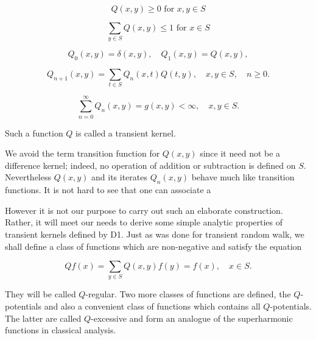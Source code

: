 $$Q(x,y) \geq 0 \text{ for } x,y \in S$$

$$\sum_{y \in S} Q(x,y) \leq 1 \text{ for } x \in S$$

$$Q_0(x,y) = \delta(x,y), \quad Q_1(x,y) = Q(x,y),$$

$$Q_{n+1}(x,y) = \sum_{t \in S} Q_n(x,t)Q(t,y), \quad x,y \in S, \quad n \geq 0.$$

$$\sum_{n=0}^{\infty} Q_n(x,y) = g(x,y) < \infty, \quad x,y \in S.$$

Such a function $Q$ is called a transient kernel.

We avoid the term transition function for $Q(x,y)$ since it need not be a difference kernel; indeed, no operation of addition or subtraction is defined on $S$. Nevertheless $Q(x,y)$ and its iterates $Q_n(x,y)$ behave much like transition functions. It is not hard to see that one can associate a

However it is not our purpose to carry out such an elaborate construction. Rather, it will meet our needs to derive some simple analytic properties of transient kernels defined by D1. Just as was done for transient random walk, we shall define a class of functions which are non-negative and satisfy the equation

$$Qf(x) = \sum_{y \in S} Q(x,y)f(y) = f(x), \quad x \in S.$$

They will be called $Q$-regular. Two more classes of functions are defined, the $Q$-potentials and also a convenient class of functions which contains all $Q$-potentials. The latter are called $Q$-excessive and form an analogue of the superharmonic functions in classical analysis.